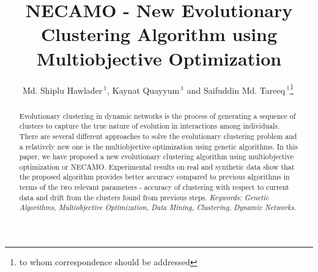 \documentclass[12pt]{arsubmit}
\begin{document}
\title{NECAMO - New Evolutionary Clustering Algorithm using Multiobjective Optimization}
\author{Md. Shiplu Hawlader\,$^{1}$, Kaynat Quayyum\,$^{1}$ and Saifuddin Md. Tareeq\,$^{1}$\footnote{to whom correspondence should be addressed}$\  $}
\date{ }

\maketitle
\begin{abstract}
Evolutionary clustering in dynamic networks is the process of generating a sequence of clusters to capture the true nature of evolution in interactions among individuals. There are several different approaches to solve the evolutionary clustering problem and a relatively new one is the multiobjective optimization using genetic algorithms. In this paper, we have proposed a new evolutionary clustering algorithm using multiobjective optimization or NECAMO. Experimental results on real and synthetic data show that the proposed algorithm provides better accuracy compared to previous algorithms in terms of the two relevant parameters - accuracy of clustering with respect to current data and drift from the clusters found from previous steps.
\newline
\newline
\em{Keywords:} Genetic Algorithms, Multiobjective Optimization, Data Mining, Clustering, Dynamic Networks.
\end{abstract}
\end{document}
